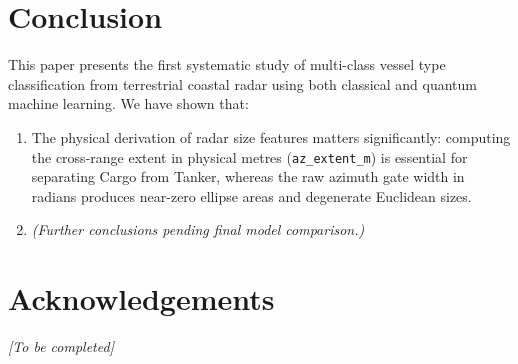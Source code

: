 \documentclass[12pt, a4paper]{article}
\begin{document}
\section{Conclusion}
\label{sec:conclusion}

This paper presents the first systematic study of multi-class vessel type
classification from terrestrial coastal radar using both classical and
quantum machine learning. We have shown that:
\begin{enumerate}
    \item The physical derivation of radar size features matters significantly:
          computing the cross-range extent in physical metres (\texttt{az\_extent\_m})
          is essential for separating Cargo from Tanker, whereas the raw azimuth
          gate width in radians produces near-zero ellipse areas and degenerate
          Euclidean sizes.
    \item \textit{(Further conclusions pending final model comparison.)}
\end{enumerate}

\section*{Acknowledgements}
\textit{[To be completed]}
\end{document}
